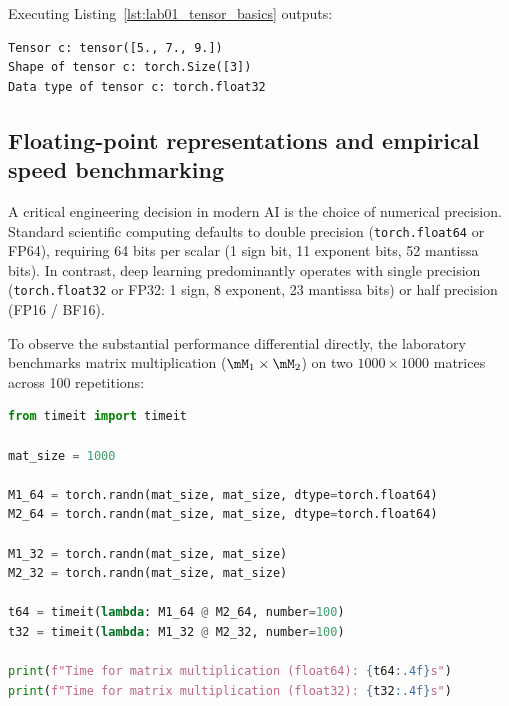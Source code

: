 \documentclass[../labs.tex]{subfiles}
\begin{document}
Executing Listing~\ref{lst:lab01_tensor_basics} outputs:
\begin{lstlisting}[style=terminalOutput]
Tensor c: tensor([5., 7., 9.])
Shape of tensor c: torch.Size([3])
Data type of tensor c: torch.float32
\end{lstlisting}

\subsection{Floating-point representations and empirical speed benchmarking}
A critical engineering decision in modern AI is the choice of numerical precision. Standard scientific computing defaults to double precision (\texttt{torch.float64} or FP64), requiring 64 bits per scalar (1 sign bit, 11 exponent bits, 52 mantissa bits). In contrast, deep learning predominantly operates with single precision (\texttt{torch.float32} or FP32: 1 sign, 8 exponent, 23 mantissa bits) or half precision (FP16 / BF16).

To observe the substantial performance differential directly, the laboratory benchmarks matrix multiplication ($\mM_1 \times \mM_2$) on two $1000 \times 1000$ matrices across 100 repetitions:

\begin{lstlisting}[language=Python, caption={Empirical matrix multiplication benchmark comparing FP64 and FP32 (Cell 6).}, label={lst:lab01_speed_benchmark}]
from timeit import timeit

mat_size = 1000

M1_64 = torch.randn(mat_size, mat_size, dtype=torch.float64)
M2_64 = torch.randn(mat_size, mat_size, dtype=torch.float64)

M1_32 = torch.randn(mat_size, mat_size)
M2_32 = torch.randn(mat_size, mat_size)

t64 = timeit(lambda: M1_64 @ M2_64, number=100)
t32 = timeit(lambda: M1_32 @ M2_32, number=100)

print(f"Time for matrix multiplication (float64): {t64:.4f}s")
print(f"Time for matrix multiplication (float32): {t32:.4f}s")
\end{lstlisting}
\end{document}
